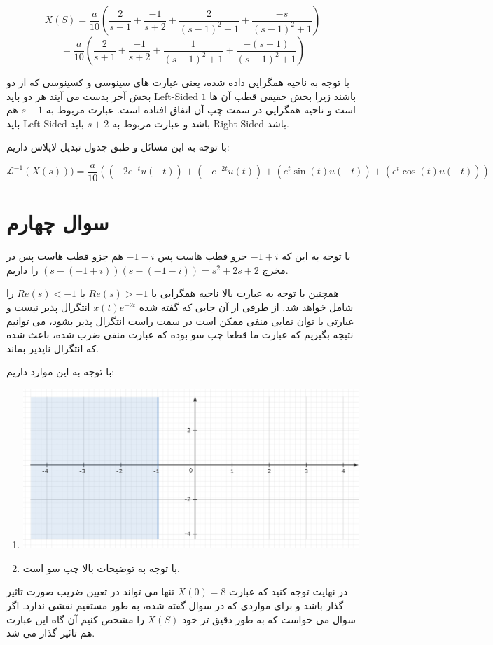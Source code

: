 \documentclass[12pt]{article}
\begin{document}
$$X(S)=\frac{a}{10}(\frac{2}{s+1} + \frac{-1}{s+2} + \frac{2  }{(s-1)^2 + 1} + \frac{- s}{(s-1)^2 +1})$$
$$= \frac{a}{10}(\frac{2}{s+1} + \frac{-1}{s+2} + \frac{1  }{(s-1)^2 + 1} + \frac{- (s-1)}{(s-1)^2 +1})$$

با توجه به ناحیه همگرایی داده شده، یعنی عبارت های سینوسی و کسینوسی که از دو بخش آخر بدست می آیند هر دو باید Left-Sided باشند زیرا بخش حقیقی قطب آن ها $1$ است و ناحیه همگرایی در سمت چپ آن اتفاق افتاده است. عبارت مربوط به $s+1$ هم باید Left-Sided باشد و عبارت مربوط به $s+2$ باید Right-Sided باشد.

با توجه به این مسائل و طبق جدول تبدیل لاپلاس داریم:

$$\mathcal{L}^{-1} (X(s)))=\frac{a}{10}\left((-2 e^{-t} u(-t)) + (- e^{-2t}u(t)) + (e^t \sin(t) u(-t)) + (e^t \cos(t) u(-t))\right)$$


\section{سوال چهارم}

با توجه به این که $-1+i$ جزو قطب هاست پس $-1-i$ هم جزو قطب هاست پس در مخرج
$(s-(-1 + i))(s-(-1 - i)) = s^2 + 2s + 2$
را داریم.

همچنین با توجه به عبارت بالا ناحیه همگرایی یا $Re(s)>-1$ یا $Re(s)<-1$ را شامل خواهد شد. از طرفی از آن جایی که گفته شده
$x(t)e^{-2t}$
انتگرال پذیر نیست و عبارتی با توان نمایی منفی ممکن است در سمت راست انتگرال پذیر بشود، می توانیم نتیجه بگیریم که عبارت ما قطعا چپ سو بوده که عبارت منفی ضرب شده، باعث شده که انتگرال ناپذیر بماند.

با توجه به این موارد داریم:



\begin{enumerate}[label = \Alph*)]
	
	\item

\begin{center}
	\includegraphics[width = 0.75 \textwidth]{images/1.png}
\end{center}



\item

با توجه به توضیحات بالا چپ سو است.
	
\end{enumerate}


در نهایت توجه کنید که عبارت $X(0)=8$
تنها می تواند در تعیین ضریب صورت تاثیر گذار باشد و برای مواردی که در سوال گفته شده، به طور مستقیم نقشی ندارد. اگر سوال می خواست که به طور دقیق تر خود $X(S)$ را مشخص کنیم آن گاه این عبارت هم تاثیر گذار می شد.
\end{document}
